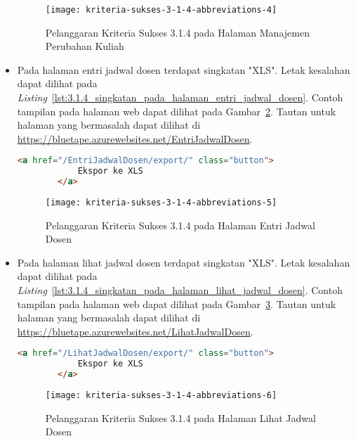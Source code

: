 \begin{itemize}
    \begin{figure}[H]
        \centering  
        \texttt{[image: kriteria-sukses-3-1-4-abbreviations-4]}  
        \caption[Pelanggaran Kriteria Sukses 3.1.4 pada Halaman Manajemen Perubahan Kuliah]{Pelanggaran Kriteria Sukses 3.1.4 pada Halaman Manajemen Perubahan Kuliah}
        \label{fig:3.1.4_abbreviations_4}  
    \end{figure}
    
    \item Pada halaman entri jadwal dosen terdapat singkatan "XLS". Letak kesalahan dapat dilihat pada \mbox{\textit{Listing} \ref{lst:3.1.4_singkatan_pada_halaman_entri_jadwal_dosen}}. Contoh tampilan pada halaman web dapat dilihat pada \mbox{Gambar \ref{fig:3.1.4_abbreviations_5}}. Tautan untuk halaman yang bermasalah dapat dilihat di \url{https://bluetape.azurewebsites.net/EntriJadwalDosen}.
    \begin{lstlisting}[frame=single, label={lst:3.1.4_singkatan_pada_halaman_entri_jadwal_dosen}, language=HTML, caption=Pelanggaran Kriteria Sukses 3.1.4 pada Halaman Entri Jadwal Dosen]
        <a href="/EntriJadwalDosen/export/" class="button">
            Ekspor ke XLS
        </a>
    \end{lstlisting}

    \begin{figure}[H]
        \centering  
        \texttt{[image: kriteria-sukses-3-1-4-abbreviations-5]}  
        \caption[Pelanggaran Kriteria Sukses 3.1.4 pada Halaman Entri Jadwal Dosen]{Pelanggaran Kriteria Sukses 3.1.4 pada Halaman Entri Jadwal Dosen}
        \label{fig:3.1.4_abbreviations_5}  
    \end{figure}
    
    \item Pada halaman lihat jadwal dosen terdapat singkatan "XLS". Letak kesalahan dapat dilihat pada \mbox{\textit{Listing} \ref{lst:3.1.4_singkatan_pada_halaman_lihat_jadwal_dosen}}. Contoh tampilan pada halaman web dapat dilihat pada \mbox{Gambar \ref{fig:3.1.4_abbreviations_6}}. Tautan untuk halaman yang bermasalah dapat dilihat di \url{https://bluetape.azurewebsites.net/LihatJadwalDosen}.
    \begin{lstlisting}[frame=single, label={lst:3.1.4_singkatan_pada_halaman_lihat_jadwal_dosen}, language=HTML, caption=Pelanggaran Kriteria Sukses 3.1.4 pada Halaman Lihat Jadwal Dosen]
        <a href="/LihatJadwalDosen/export/" class="button">
            Ekspor ke XLS
        </a>
    \end{lstlisting}

    \begin{figure}[H]
        \centering  
        \texttt{[image: kriteria-sukses-3-1-4-abbreviations-6]}  
        \caption[Pelanggaran Kriteria Sukses 3.1.4 pada Halaman Lihat Jadwal Dosen]{Pelanggaran Kriteria Sukses 3.1.4 pada Halaman Lihat Jadwal Dosen}
        \label{fig:3.1.4_abbreviations_6}  
    \end{figure}
\end{itemize}


